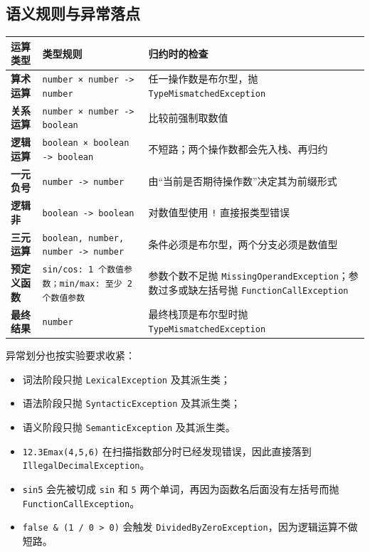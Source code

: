 \documentclass[12pt,a4paper,fontset=none]{ctexart}
\begin{document}
\subsection{语义规则与异常落点}

\begin{table}[H]
  \centering
  \begin{tabularx}{\textwidth}{>{\bfseries}P{2.8cm}P{4.5cm}Y}
    \toprule
    运算类型 & 类型规则 & 归约时的检查 \\
    \midrule
    算术运算 & \texttt{number × number -> number} & 任一操作数是布尔型，抛 \texttt{TypeMismatchedException} \\
    关系运算 & \texttt{number × number -> boolean} & 比较前强制取数值 \\
    逻辑运算 & \texttt{boolean × boolean -> boolean} & 不短路；两个操作数都会先入栈、再归约 \\
    一元负号 & \texttt{number -> number} & 由“当前是否期待操作数”决定其为前缀形式 \\
    逻辑非 & \texttt{boolean -> boolean} & 对数值型使用 \texttt{!} 直接报类型错误 \\
    三元运算 & \texttt{boolean, number, number -> number} & 条件必须是布尔型，两个分支必须是数值型 \\
    预定义函数 & \texttt{sin/cos: 1 个数值参数；min/max: 至少 2 个数值参数} & 参数个数不足抛 \texttt{MissingOperandException}；参数过多或缺左括号抛 \texttt{FunctionCallException} \\
    最终结果 & \texttt{number} & 最终栈顶是布尔型时抛 \texttt{TypeMismatchedException} \\
    \bottomrule
  \end{tabularx}
\end{table}

异常划分也按实验要求收紧：

\begin{itemize}
  \item 词法阶段只抛 \texttt{LexicalException} 及其派生类；
  \item 语法阶段只抛 \texttt{SyntacticException} 及其派生类；
  \item 语义阶段只抛 \texttt{SemanticException} 及其派生类。
\end{itemize}

\begin{plainBox}
\begin{itemize}
  \item \texttt{12.3Emax(4,5,6)} 在扫描指数部分时已经发现错误，因此直接落到 \texttt{IllegalDecimalException}。
  \item \texttt{sin5} 会先被切成 \texttt{sin} 和 \texttt{5} 两个单词，再因为函数名后面没有左括号而抛 \texttt{FunctionCallException}。
  \item \texttt{false \& (1 / 0 > 0)} 会触发 \texttt{DividedByZeroException}，因为逻辑运算不做短路。
\end{itemize}
\end{plainBox}
\end{document}
